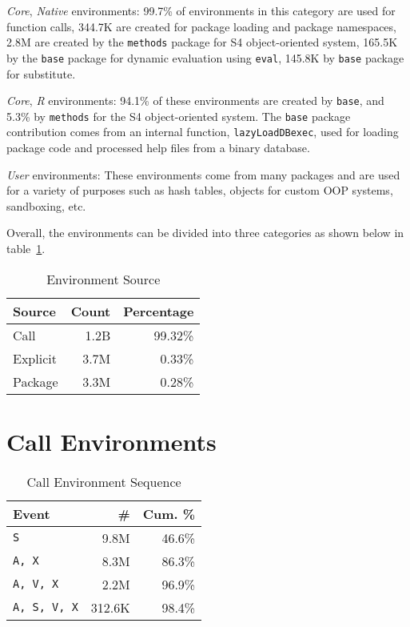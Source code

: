 \documentclass[10pt,review,sigplan,anonymous=true,authorversion=true,nonacm=true]{acmart}
\newcommand{\code}[1]{\lstinline |#1|\xspace}
\begin{document}
\emph{Core}, \emph{Native} environments: 99.7\% of environments in this category
are used for function calls, 344.7K are created for package loading and package
namespaces, 2.8M are created by the \code{methods} package for S4
object-oriented system, 165.5K by the \code{base} package for dynamic evaluation
using \code{eval}, 145.8K by \code{base} package for substitute.

\emph{Core}, \emph{R} environments: 94.1\% of these environments are created by
\code{base}, and 5.3\% by \code{methods} for the S4 object-oriented system. The
\code{base} package contribution comes from an internal function,
\code{lazyLoadDBexec}, used for loading package code and processed help files
from a binary database.

\emph{User} environments: These environments come from many packages and are
used for a variety of purposes such as hash tables, objects for custom OOP
systems, sandboxing, etc.

Overall, the environments can be divided into three categories as shown below in
table~\ref{table:env_category}.

\begin{table}
  \vspace{-3mm}
  \small
  \caption{Environment Source} \label{table:env_category}
  \centering
  \begin{tabular}{l|rr}
    \toprule
    \textbf{Source}&\textbf{Count}&\textbf{Percentage}\\
    \midrule
    Call&1.2B&99.32\%\\
    Explicit&3.7M&0.33\%\\
    Package&3.3M&0.28\%\\
    \bottomrule
  \end{tabular}
\end{table}

\section{Call Environments}


\begin{table}[!h]
  \vspace{-3mm}
  \small
  \caption{Call Environment Sequence} \label{table:call_env_seq}
  \centering
  \begin{tabular}{lrr}
    \toprule
    \textbf{Event}&\textbf{\#}&\textbf{Cum. \%}\\
    \midrule
    \texttt{S}&9.8M&46.6\%\\
    \texttt{A, X}&8.3M&86.3\%\\
    \texttt{A, V, X}&2.2M&96.9\%\\
    \texttt{A, S, V, X}&312.6K&98.4\%\\
    \bottomrule
  \end{tabular}
\end{table}
\end{document}
